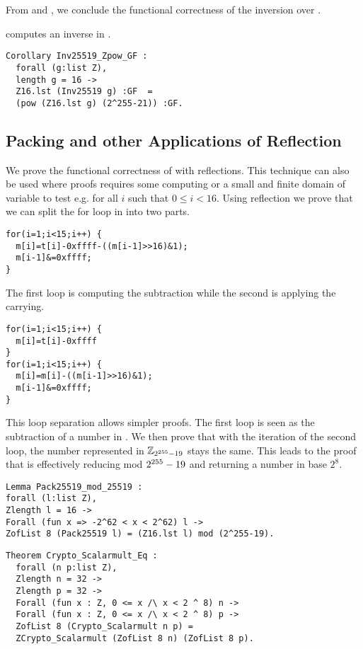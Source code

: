 From  and , we conclude the
functional correctness of the inversion over \Zfield.
\begin{corollary}
 computes an inverse in \Zfield.
\end{corollary}
\begin{lstlisting}[language=Coq]
Corollary Inv25519_Zpow_GF :
  forall (g:list Z),
  length g = 16 ->
  Z16.lst (Inv25519 g) :GF  =
  (pow (Z16.lst g) (2^255-21)) :GF.
\end{lstlisting}

\subsection{Packing and other Applications of Reflection}

We prove the functional correctness of  with reflections.
This technique can also be used where proofs requires some computing or a small and
finite domain of variable to test e.g. for all $i$ such that $0 \le i < 16$.
Using reflection we prove that we can split the for loop in  into two parts.
\begin{lstlisting}[language=Ctweetnacl]
for(i=1;i<15;i++) {
  m[i]=t[i]-0xffff-((m[i-1]>>16)&1);
  m[i-1]&=0xffff;
}
\end{lstlisting}
The first loop is computing the subtraction while the second is applying the carrying.
\begin{lstlisting}[language=Ctweetnacl]
for(i=1;i<15;i++) {
  m[i]=t[i]-0xffff
}
for(i=1;i<15;i++) {
  m[i]=m[i]-((m[i-1]>>16)&1);
  m[i-1]&=0xffff;
}
\end{lstlisting}
This loop separation allows simpler proofs. The first loop is seen as the subtraction of a number in \Zfield.
We then prove that with the iteration of the second loop, the number represented in $\mathbb{Z}_{2^{255}-19}$ stays the same.
This leads to the proof that  is effectively reducing mod $2^{255}-19$ and returning a number in base $2^8$.

\begin{lstlisting}[language=Coq]
Lemma Pack25519_mod_25519 :
forall (l:list Z),
Zlength l = 16 ->
Forall (fun x => -2^62 < x < 2^62) l ->
ZofList 8 (Pack25519 l) = (Z16.lst l) mod (2^255-19).
\end{lstlisting}



\begin{lstlisting}[language=Coq]
Theorem Crypto_Scalarmult_Eq :
  forall (n p:list Z),
  Zlength n = 32 ->
  Zlength p = 32 ->
  Forall (fun x : Z, 0 <= x /\ x < 2 ^ 8) n ->
  Forall (fun x : Z, 0 <= x /\ x < 2 ^ 8) p ->
  ZofList 8 (Crypto_Scalarmult n p) =
  ZCrypto_Scalarmult (ZofList 8 n) (ZofList 8 p).
\end{lstlisting}
